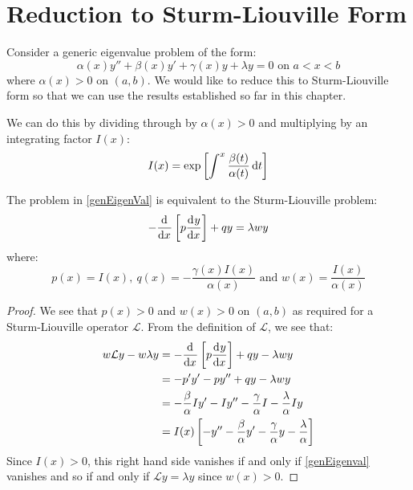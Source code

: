 \documentclass[../main.tex]{subfiles}
\begin{document}
\section{Reduction to Sturm-Liouville Form}
Consider a generic eigenvalue problem of the form:
\begin{equation}
  \alpha(x) y'' + \beta(x) y' + \gamma(x) y + \lambda y = 0 \text{ on } a < x < b \label{genEigenval}
\end{equation}
where $\alpha(x) > 0$ on $(a, b)$.
We would like to reduce this to Sturm-Liouville form so that we can use the results established so far in this chapter.

We can do this by dividing through by $\alpha(x) > 0$ and multiplying by an integrating factor $I(x)$:
\[
  I(x) = \exp\left[\int_{}^{x} \frac{\beta(t)}{\alpha(t)} \d{t}\right]
\]
\begin{proposition}
  The problem in \cref{genEigenVal} is equivalent to the Sturm-Liouville problem:
  \[
    -\deriv{}{x}\left[p \deriv{y}{x}\right] + qy = \lambda w y
  \]
  where:
  \[
    p(x) = I(x),\ q(x) = - \frac{\gamma(x)I(x)}{\alpha(x)} \text{ and } w(x) = \frac{I(x)}{\alpha(x)}
  \]
\end{proposition}
\begin{proof}
  We see that $p(x) > 0$ and $w(x) > 0$ on $(a, b)$ as required for a Sturm-Liouville operator $\mathcal{L}$.
  From the definition of $\mathcal{L}$, we see that:
  \begin{align*}
    w\mathcal{L}y - w\lambda y &= -\deriv{}{x}\left[p \deriv{y}{x}\right] + qy - \lambda w y \\
                             &= - p'y' - py'' + qy - \lambda w y \\
                             &= - \frac{\beta}{\alpha} Iy' - Iy'' - \frac{\gamma}{\alpha}I - \frac{\lambda}{\alpha} Iy \\
                             &= I(x) \left[-y'' - \frac{\beta}{\alpha}y' - \frac{\gamma}{\alpha} y - \frac{\lambda}{\alpha}\right]
  \end{align*}
  Since $I(x) > 0$, this right hand side vanishes if and only if \cref{genEigenval} vanishes and so if and only if $\mathcal{L} y = \lambda y$ since $w(x) > 0$.
\end{proof}
\end{document}
